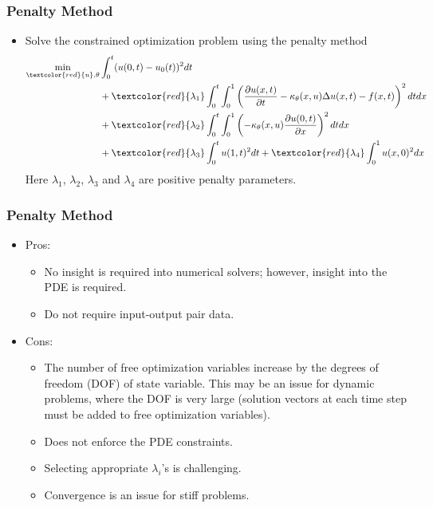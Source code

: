 \documentclass{beamer}
\begin{document}
\begin{frame}
	\frametitle{Penalty Method}
	
	\begin{itemize}
		\item Solve the constrained optimization problem using the penalty method
		\begin{align*}
\min_{\textcolor{red}{u},\theta} &  \int_{0}^t ( u(0, t)- u_0(t))^2 dt \\
& + \textcolor{red}{\lambda_1} \int_{0}^t \int_{0}^1 \left(\frac{\partial u(x, t)}{\partial t} - {\kappa_\theta(x, u)}\Delta u(x, t) - f(x, t)\right)^2 dtdx\\
&	+  \textcolor{red}{\lambda_2}\int_0^t \int_0^1	\left(-{\kappa_\theta(x, u)}\frac{\partial u(0,t)}{\partial x}\right)^2 dtdx \\
& +  \textcolor{red}{\lambda_3}\int_0^t u(1, t)^2 dt+   \textcolor{red}{\lambda_4}\int_0^1 u(x, 0)^2 dx
		\end{align*}
	Here $\lambda_1$, $\lambda_2$, $\lambda_3$ and $\lambda_4$ are positive penalty parameters. 

	\end{itemize}
\end{frame}


\begin{frame}
	\frametitle{Penalty Method}
	\begin{itemize}
		\item Pros:
		\begin{itemize}
		\item No insight is required into numerical solvers; however, insight into the PDE is required. 
		\item Do not require input-output pair data. 
		\end{itemize}
		\item Cons:
		\begin{itemize}
		\item The number of free optimization variables increase by the degrees of freedom (DOF) of state variable. This may be an issue for dynamic problems, where the DOF is very large (solution vectors at each time step must be added to free optimization variables). 
		\item Does not enforce the PDE constraints.
		\item Selecting appropriate $\lambda_i$'s is challenging. 
		\item Convergence is an issue for stiff problems. 
		\end{itemize}
		
	\end{itemize}
\end{frame}
\end{document}
